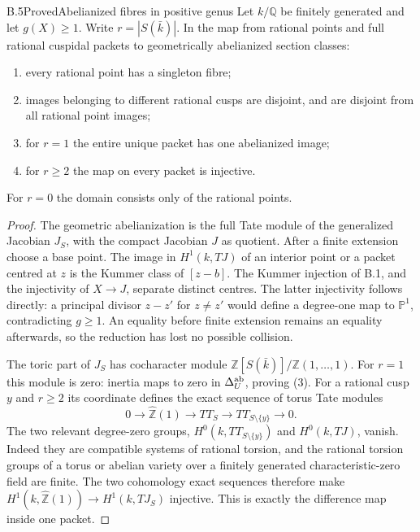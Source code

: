 \begin{statement}{B.5}{Proved}{Abelianized fibres in positive genus}
Let $k/\mathbb Q$ be finitely generated and let $g(X)\geq1$.
Write $r=|S(\bar k)|$.  In the map from rational points and full rational
cuspidal packets to geometrically abelianized section classes:
\begin{enumerate}
\item every rational point has a singleton fibre;
\item images belonging to different rational cusps are disjoint, and
      are disjoint from all rational point images;
\item for $r=1$ the entire unique packet has one abelianized image;
\item for $r\geq2$ the map on every packet is injective.
\end{enumerate}
For $r=0$ the domain consists only of the rational points.
\end{statement}
\begin{proof}
The geometric abelianization is the full Tate module of the generalized
Jacobian $J_S$, with the compact Jacobian $J$ as quotient.  After a
finite extension choose a base point.  The image in $H^1(k,TJ)$ of an
interior point or a packet centred at $z$ is the Kummer class of
$[z-b]$.  The Kummer injection of B.1, and the injectivity of
$X\to J$, separate distinct centres.  The latter injectivity follows
directly: a principal divisor $z-z'$ for $z\ne z'$ would define a
degree-one map to $\mathbb P^1$, contradicting $g\geq1$.
An equality before finite extension remains an equality afterwards,
so the reduction has lost no possible collision.

The toric part of $J_S$ has cocharacter module
$\mathbb Z[S(\bar k)]/\mathbb Z(1,\ldots,1)$.
For $r=1$ this module is zero: inertia maps to zero in
$\Delta_U^{\rm ab}$, proving (3).
For a rational cusp $y$ and $r\geq2$ its coordinate defines the exact
sequence of torus Tate modules
\[
 0\to\widehat{\mathbb Z}(1)\to TT_S\to TT_{S\setminus\{y\}}\to0.
\]
The two relevant degree-zero groups, $H^0(k,TT_{S\setminus\{y\}})$ and
$H^0(k,TJ)$, vanish.  Indeed they are compatible systems of rational
torsion, and the rational torsion groups of a torus or abelian variety
over a finitely generated characteristic-zero field are finite.
The two cohomology exact sequences therefore make
$H^1(k,\widehat{\mathbb Z}(1))\to H^1(k,TJ_S)$ injective.
This is exactly the difference map inside one packet.
\end{proof}

